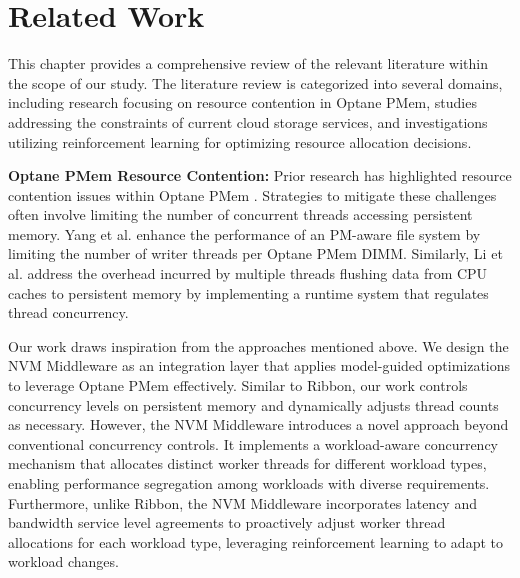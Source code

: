 \chapter{Related Work}

This chapter provides a comprehensive review of the relevant literature within the scope of our study. The literature review is categorized into several domains, including research focusing on resource contention in Optane PMem, studies addressing the constraints of current cloud storage services, and investigations utilizing reinforcement learning for optimizing resource allocation decisions.

\textbf{Optane PMem Resource Contention:} Prior research has highlighted resource contention issues within Optane PMem \cite{yang2020empirical,wu2020ribbon}. Strategies to mitigate these challenges often involve limiting the number of concurrent threads accessing persistent memory. Yang et al. \cite{yang2020empirical} enhance the performance of an PM-aware file system by limiting the number of writer threads per Optane PMem DIMM. Similarly, Li et al. \cite{wu2020ribbon} address the overhead incurred by multiple threads flushing data from CPU caches to persistent memory by implementing a runtime system that regulates thread concurrency.

Our work draws inspiration from the approaches mentioned above. We design the NVM Middleware as an integration layer that applies model-guided optimizations to leverage Optane PMem effectively. Similar to Ribbon, our work controls concurrency levels on persistent memory and dynamically adjusts thread counts as necessary. However, the NVM Middleware introduces a novel approach beyond conventional concurrency controls. It implements a workload-aware concurrency mechanism that allocates distinct worker threads for different workload types, enabling performance segregation among workloads with diverse requirements. Furthermore, unlike Ribbon, the NVM Middleware incorporates latency and bandwidth service level agreements to proactively adjust worker thread allocations for each workload type, leveraging reinforcement learning to adapt to workload changes.


